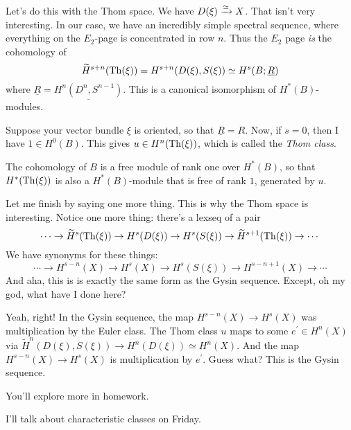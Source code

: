 Let's do this with the Thom space.
We have $D(\xi) \xrightarrow{{\simeq}} X$.
That isn't very interesting.
In our case, we have an incredibly simple spectral sequence, where everything on the $E_2$-page is concentrated in row $n$.
Thus the $E_2$ page \emph{is} the cohomology of
$$\widetilde{H}^{s+n}(\operatorname{Th}(\xi)) = H^{s+n}(D(\xi),S(\xi)) \simeq H^s(B; \underline{R})$$
where $\underline{R} = \underline{H^n(D^n,S^{n-1})}$.
This is a canonical isomorphism of $H^\ast(B)$-modules.

Suppose your vector bundle $\xi$ is oriented, so that $\underline{R} = R$.
Now, if $s=0$, then I have $1\in H^0(B)$.
This gives $u\in H^n(\operatorname{Th}(\xi))$, which is called the \emph{Thom class}.

The cohomology of $B$ is a free module of rank one over $H^\ast(B)$, so that $H^\ast(\operatorname{Th}(\xi))$ is also a $H^\ast(B)$-module that is free of rank $1$, generated by $u$.

Let me finish by saying one more thing.
This is why the Thom space is interesting.
Notice one more thing: there's a lexseq of a pair
$$
\cdots\to \widetilde{H}^s(\operatorname{Th}(\xi)) \to H^s(D(\xi)) \to H^s(S(\xi)) \to \widetilde{H}^{s+1}(\operatorname{Th}(\xi)) \to \cdots
$$
We have synonyms for these things:
$$
\cdots \to H^{s-n}(X) \to H^s(X) \to H^s(S(\xi)) \to H^{s-n+1}(X) \to \cdots
$$
And aha, this is is exactly the same form as the Gysin sequence.
Except, oh my god, what have I done here?

Yeah, right!
In the Gysin sequence, the map $H^{s-n}(X) \to H^s(X)$ was multiplication by the Euler class.
The Thom class $u$ maps to some $e^\prime\in H^n(X)$ via $\widetilde{H}^n(D(\xi),S(\xi)) \to H^n(D(\xi)) \simeq H^n(X)$.
And the map $H^{s-n}(X) \to H^s(X)$ is multiplication by $e^\prime$.
Guess what?
This is the Gysin sequence.

You'll explore more in homework.

I'll talk about characteristic classes on Friday.
